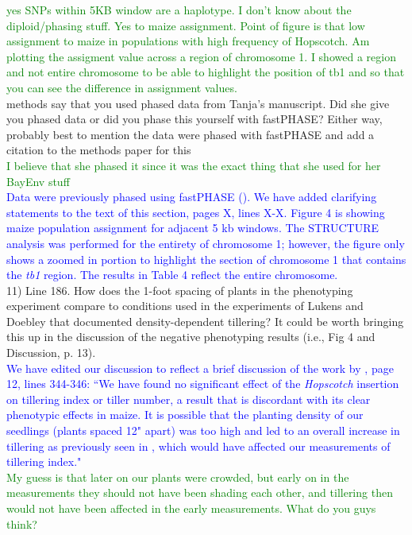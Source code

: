 \documentclass[11pt]{article}
\newcommand{\res}[1]{\noindent \textcolor{blue}{{#1}} \\}
\newcommand{\lev}[1]{\noindent \textcolor{green}{{#1}} \\}
\newcommand{\mbh}[1]{\noindent \textcolor{Dandelion}{{#1}}\\}
\begin{document}
\lev{yes SNPs within 5KB window are a haplotype. I don't know about the diploid/phasing stuff. Yes to maize assignment. Point of figure is that low assignment to maize in populations with high frequency of Hopscotch. Am plotting the assigment value across a region of chromosome 1. I showed a region and not entire chromosome to be able to highlight the position of tb1 and so that you can see the difference in assignment values.}

\mbh{methods say that you used phased data from Tanja's manuscript.  Did she give you phased data or did you phase this yourself with fastPHASE?  Either way, probably best to mention the data were phased with fastPHASE and add a citation to the methods paper for this}

\lev{I believe that she phased it since it was the exact thing that she used for her BayEnv stuff}

\res{Data were previously phased using fastPHASE (\lef{cite tanja and fastPHASE paper}). We have added clarifying statements to the text of this section, pages X, lines X-X. Figure 4 is showing maize population assignment for adjacent 5 kb windows. The STRUCTURE analysis was performed for the entirety of chromosome 1; however, the figure only shows a zoomed in portion to highlight the section of chromosome 1 that contains the \emph{tb1} region. The results in Table 4 reflect the entire chromosome.}

11) Line 186. How does the 1-foot spacing of plants in the phenotyping experiment compare to conditions used in the experiments of Lukens and Doebley that documented density-dependent tillering? It could be worth bringing this up in the discussion of the negative phenotyping results (i.e., Fig 4 and Discussion, p. 13). \\

\res{We have edited our discussion to reflect a brief discussion of the work by \citet{DoebleyLukens1999}, page 12, lines 344-346: ``We have found no significant effect of the \emph{Hopscotch} insertion on tillering index or tiller number, a result that is discordant with its clear phenotypic effects in maize. It is possible that the planting density of our seedlings (plants spaced 12" apart) was too high and led to an overall increase in tillering as previously seen in \citet{LukensDoebley1999}, which would have affected our measurements of tillering index."}

\lev{My guess is that later on our plants were crowded, but early on in the measurements they should not have been shading each other, and tillering then would not have been affected in the early measurements. What do you guys think?}
\end{document}
